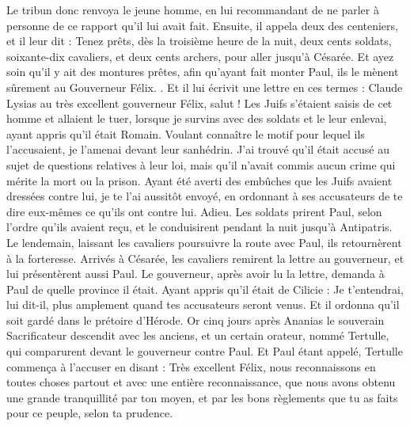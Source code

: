 \begin{multicols}{2}
Le tribun donc renvoya le jeune homme, en lui recommandant de ne parler à personne de ce rapport qu’il lui avait fait.
Ensuite, il appela deux des centeniers, et il leur dit : Tenez prêts, dès la troisième heure de la nuit, deux cents soldats, soixante-dix cavaliers, et deux cents archers, pour aller jusqu’à Césarée.
Et ayez soin qu'il y ait des montures prêtes, afin qu'ayant fait monter Paul, ils le mènent sûrement au Gouverneur Félix. .
Et il lui écrivit une lettre en ces termes :
Claude Lysias au très excellent gouverneur Félix, salut !
Les Juifs s’étaient saisis de cet homme et allaient le tuer, lorsque je survins avec des soldats et le leur enlevai, ayant appris qu’il était Romain.
Voulant connaître le motif pour lequel ils l'accusaient, je l’amenai devant leur sanhédrin.
J’ai trouvé qu’il était accusé au sujet de questions relatives à leur loi, mais qu’il n’avait commis aucun crime qui mérite la mort ou la prison.
Ayant été averti des embûches que les Juifs avaient dressées contre lui, je te l'ai aussitôt envoyé, en ordonnant à ses accusateurs de te dire eux-mêmes ce qu’ils ont contre lui. Adieu.
Les soldats prirent Paul, selon l’ordre qu’ils avaient reçu, et le conduisirent pendant la nuit jusqu’à Antipatris.
Le lendemain, laissant les cavaliers poursuivre la route avec Paul, ils retournèrent à la forteresse.
Arrivés à Césarée, les cavaliers remirent la lettre au gouverneur, et lui présentèrent aussi Paul.
Le gouverneur, après avoir lu la lettre, demanda à Paul de quelle province il était. Ayant appris qu'il était de Cilicie :
Je t'entendrai, lui dit-il, plus amplement quand tes accusateurs seront venus. Et il ordonna qu'il soit gardé dans le prétoire d'Hérode.
\VerseOne{}Or cinq jours après Ananias le souverain Sacrificateur descendit avec les anciens, et un certain orateur, nommé Tertulle, qui comparurent devant le gouverneur contre Paul. 
Et Paul étant appelé, Tertulle commença à l'accuser en disant :
Très excellent Félix, nous reconnaissons en toutes choses partout et avec une entière reconnaissance, que nous avons obtenu une grande tranquillité par ton moyen, et par les bons règlements que tu as faits pour ce peuple, selon ta prudence.

\end{multicols}
